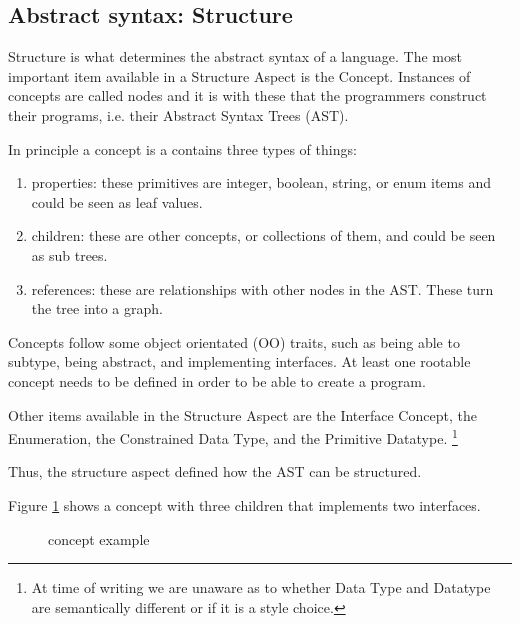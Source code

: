 \subsection{Abstract syntax: Structure}
Structure is what determines the abstract syntax of a language.
The most important item available in a Structure Aspect is the Concept.
Instances of concepts are called nodes and it is with these that the programmers construct their programs, i.e. their Abstract Syntax Trees (AST).

In principle a concept is a contains three types of things:
\begin{enumerate}
    \item properties: these primitives are integer, boolean, string, or enum items and could be seen as leaf values.
    \item children: these are other concepts, or collections of them, and could be seen as sub trees.
    \item references: these are relationships with other nodes in the AST. These turn the tree into a graph.
\end{enumerate}

Concepts follow some object orientated (OO) traits, such as being able to subtype, being abstract, and implementing interfaces.
At least one rootable concept needs to be defined in order to be able to create a program.

Other items available in the Structure Aspect are the Interface Concept, the Enumeration, the Constrained Data Type, and the Primitive Datatype.
\footnote{At time of writing we are unaware as to whether Data Type and Datatype are semantically different or if it is a style choice.}

Thus, the structure aspect defined how the AST can be structured.

Figure \ref{fig:concept_example} shows a concept with three children that implements two interfaces.

\begin{figure}[h]
    \centering
    \caption{concept example}
    \label{fig:concept_example}
\end{figure}
 

